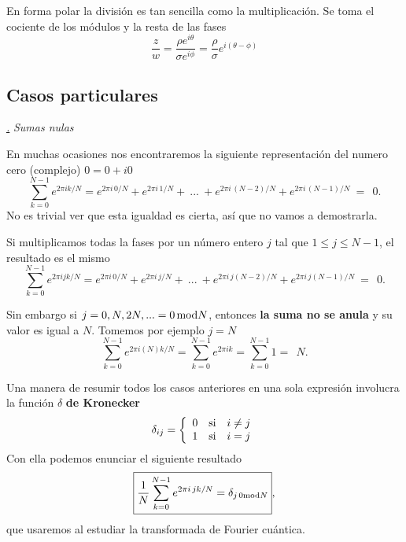 \documentclass[a4paper,11pt]{book} %
\numberwithin{equation}{chapter}
\def\subsubiContadorIt{\par\addtocounter{subsubsection}{1}\underline{\it\thesubsubsection.}\hskip0.5cm \setcounter{subsubsubsectionIt}{0}}
\newcommand{\SubsubiIt}[1]{
		\subsubiContadorIt \textit{#1}
	}
\newcounter{subsubsubsectionIt}[subsubsection]
\begin{document}
En forma polar la división es tan sencilla como la multiplicación. Se toma el  cociente de los módulos y la resta de las fases
	\begin{equation}
	\frac{z}{w} = \frac{\rho e^{i\theta}}{\sigma e^{i\phi}} = \frac{\rho}{\sigma} e^{i(\theta-\phi)}
	\end{equation}


			
		\subsection{Casos particulares}
		
			\SubsubiIt{Sumas nulas}
			
En muchas ocasiones nos encontraremos la siguiente representación del numero cero (complejo) $0 = 0 + i 0$
	\begin{equation}
\sum_{k=0}^{N-1} e^{2\pi i k/N} =   e^{2\pi i\, 0/N} +  e^{2\pi i\, 1/N}  +~...~ +   e^{2\pi i\, (N-2)/N}+   e^{2\pi i\, (N-1)/N} ~=~  ~0.
	\end{equation}
No es trivial ver que esta igualdad es cierta, así que no vamos a demostrarla.
			
Si multiplicamos todas la fases por un número entero $j$ tal que $1\leq j \leq N-1$, el resultado es el mismo
$$
\sum_{k=0}^{N-1} e^{2\pi i j k/N} =   e^{2\pi i \, 0/N} +  e^{2\pi i \, j/N}  +~...~ +   e^{2\pi i \, j(N-2)/N}+   e^{2\pi i \, j(N-1)/N} ~=~  ~0.
$$

Sin embargo si $j = 0, N, 2N,... = 0\,\hbox{mod} N$, entonces \textbf{la suma no se anula} y su valor es igual a $N$. Tomemos por ejemplo $j=N$ 
$$
\sum_{k=0}^{N-1} e^{2\pi i (N) k/N} = \sum_{k=0}^{N-1} e^{2\pi i  k}  =  \sum_{k=0}^{N-1} 1 =~  ~N.
$$

Una manera de resumir todos los casos anteriores en una sola expresión involucra la función $\delta$ \textbf{de Kronecker}
	\begin{equation} \label{ec_fundamentos_delta_de_kronecker}
	\delta_{ij} = \left\{ \begin{array}{rcl} 0 & \hbox{si} & i\neq j \\ 1 & \hbox{si} & i = j \end{array} \right.
	\end{equation}
Con ella podemos enunciar el siguiente resultado 
	\begin{equation}
	\boxed{\frac{1}{N}\sum_{k=0}^{N-1} e^{2\pi i \, j k/N} =  \delta_{j\, 0{\rm mod} N}},
	\end{equation}
que usaremos al estudiar la transformada de Fourier cuántica.
			
\end{document}
